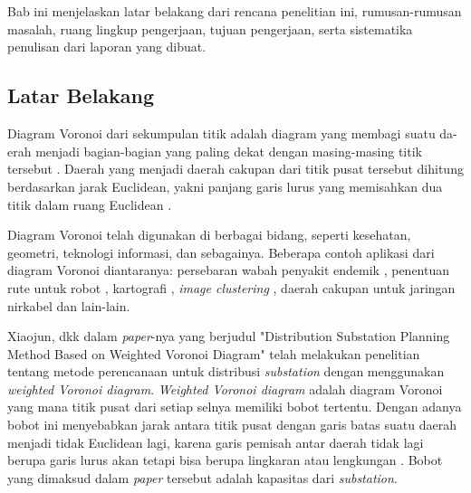 \chapter{\babSatu}
Bab ini menjelaskan latar belakang dari rencana penelitian ini, rumusan-rumusan masalah, ruang lingkup pengerjaan, tujuan pengerjaan, serta sistematika penulisan dari laporan yang dibuat.

\section{Latar Belakang}

Diagram Voronoi dari sekumpulan titik adalah diagram yang membagi suatu da-
erah menjadi bagian-bagian yang paling dekat dengan masing-masing titik tersebut \cite{geometric.algebra}. Daerah yang menjadi daerah cakupan dari titik pusat tersebut dihitung berdasarkan jarak Euclidean, yakni panjang garis lurus yang memisahkan dua titik dalam ruang Euclidean \cite{euclidean.distance}.

Diagram Voronoi telah digunakan di berbagai bidang, seperti kesehatan, geometri, teknologi informasi, dan sebagainya. Beberapa contoh aplikasi dari diagram Voronoi diantaranya: persebaran wabah penyakit endemik \cite{cholera}, penentuan rute untuk robot \cite{robot}, kartografi \cite{cartography}, \textit{image clustering} \cite{image.clustering}, daerah cakupan untuk jaringan nirkabel \cite{voronoi.wireless} dan lain-lain.

Xiaojun, dkk dalam \textit{paper}-nya yang berjudul "Distribution Substation Planning Method Based on Weighted Voronoi Diagram" \cite{substation} telah melakukan penelitian tentang metode perencanaan untuk distribusi \textit{substation} dengan menggunakan \textit{weighted Voronoi diagram}. \textit{Weighted Voronoi diagram} adalah diagram Voronoi yang mana titik pusat dari setiap selnya memiliki bobot tertentu. Dengan adanya bobot ini menyebabkan jarak antara titik pusat dengan garis batas suatu daerah menjadi tidak Euclidean lagi, karena garis pemisah antar daerah tidak lagi berupa garis lurus akan tetapi bisa berupa lingkaran atau lengkungan \cite{spatial.tessellations}. Bobot yang dimaksud dalam \textit{paper} tersebut adalah kapasitas dari \textit{substation}.

